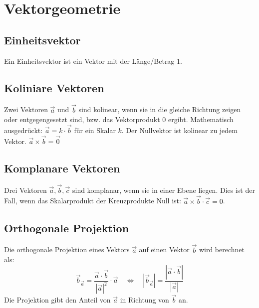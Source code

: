 \documentclass{article}
\begin{document}
\section*{Vektorgeometrie}
\begin{minipage}[t]{0.45\textwidth}
    \subsection*{Einheitsvektor}
    Ein Einheitsvektor ist ein Vektor mit der Länge/Betrag 1.

    \subsection*{Koliniare Vektoren}
    Zwei Vektoren \( \vec{a} \) und \( \vec{b} \) sind kolinear, wenn sie in die gleiche Richtung zeigen oder entgegengesetzt sind, bzw. das Vektorprodukt 0 ergibt. Mathematisch ausgedrückt: \( \vec{a} = k \cdot \vec{b} \) für ein Skalar \( k \).
    Der Nullvektor ist kolinear zu jedem Vektor. \( \vec{a} \times \vec{b} = \vec{0} \)

    \subsection*{Komplanare Vektoren}
    Drei Vektoren \( \vec{a}, \vec{b}, \vec{c} \) sind komplanar, wenn sie in einer Ebene liegen. Dies ist der Fall, wenn das Skalarprodukt der Kreuzprodukte Null ist: \( \vec{a} \times \vec{b} \cdot \vec{c} = 0 \).

    \subsection*{Orthogonale Projektion}
    Die orthogonale Projektion eines Vektors \( \vec{a} \) auf einen Vektor \( \vec{b} \) wird berechnet als:
    \begin{equation*}
        \vec{b}_{\vec{a}} = \frac{\vec{a} \cdot \vec{b}}{|\vec{a}|^2} \cdot \vec{a} 
        \quad \Leftrightarrow \quad 
        |\vec{b}_{\vec{a}}| = \frac{|\vec{a} \cdot \vec{b}|}{|\vec{a}|}
    \end{equation*}
    Die Projektion gibt den Anteil von \( \vec{a} \) in Richtung von \( \vec{b} \) an.


\end{minipage}
\end{document}
